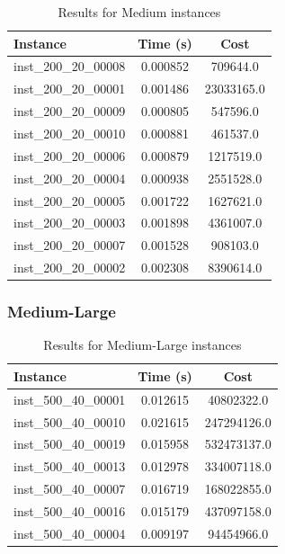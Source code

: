 \documentclass{article}
\begin{document}
\begin{table}[H]
\centering
\begin{tabular}{lcc}
\toprule
\textbf{Instance}         & \textbf{Time (s)} & \textbf{Cost} \\ 
\midrule
inst\_200\_20\_00008 & 0.000852 & 709644.0   \\ 
inst\_200\_20\_00001 & 0.001486 & 23033165.0 \\ 
inst\_200\_20\_00009 & 0.000805 & 547596.0   \\ 
inst\_200\_20\_00010 & 0.000881 & 461537.0   \\ 
inst\_200\_20\_00006 & 0.000879 & 1217519.0  \\ 
inst\_200\_20\_00004 & 0.000938 & 2551528.0  \\ 
inst\_200\_20\_00005 & 0.001722 & 1627621.0  \\ 
inst\_200\_20\_00003 & 0.001898 & 4361007.0  \\ 
inst\_200\_20\_00007 & 0.001528 & 908103.0   \\ 
inst\_200\_20\_00002 & 0.002308 & 8390614.0  \\ 
\bottomrule
\end{tabular}
\caption{Results for Medium instances}
\end{table}

\subsubsection*{Medium-Large}
\begin{table}[h!]
\centering
\begin{tabular}{lcc}
\toprule
\textbf{Instance}         & \textbf{Time (s)} & \textbf{Cost} \\ 
\midrule
inst\_500\_40\_00001 & 0.012615 & 40802322.0  \\ 
inst\_500\_40\_00010 & 0.021615 & 247294126.0 \\ 
inst\_500\_40\_00019 & 0.015958 & 532473137.0 \\ 
inst\_500\_40\_00013 & 0.012978 & 334007118.0 \\ 
inst\_500\_40\_00007 & 0.016719 & 168022855.0 \\ 
inst\_500\_40\_00016 & 0.015179 & 437097158.0 \\ 
inst\_500\_40\_00004 & 0.009197 & 94454966.0  \\ 
\bottomrule
\end{tabular}
\caption{Results for Medium-Large instances}
\end{table}
\end{document}
